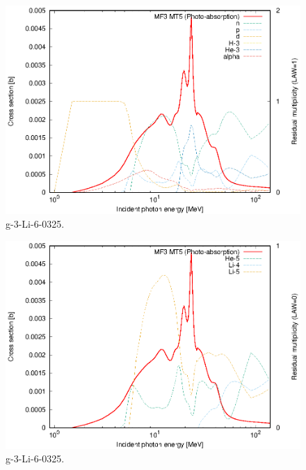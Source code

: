 \begin{figure}
 \includegraphics[width=\linewidth]{eps/g_3-Li-6_0325.eps}
  \caption{g-3-Li-6-0325.}
\end{figure}
\begin{figure}
 \includegraphics[width=\linewidth]{eps-law0/g_3-Li-6_0325.eps}
 \caption{g-3-Li-6-0325.}
\end{figure}
\newpage \clearpage

